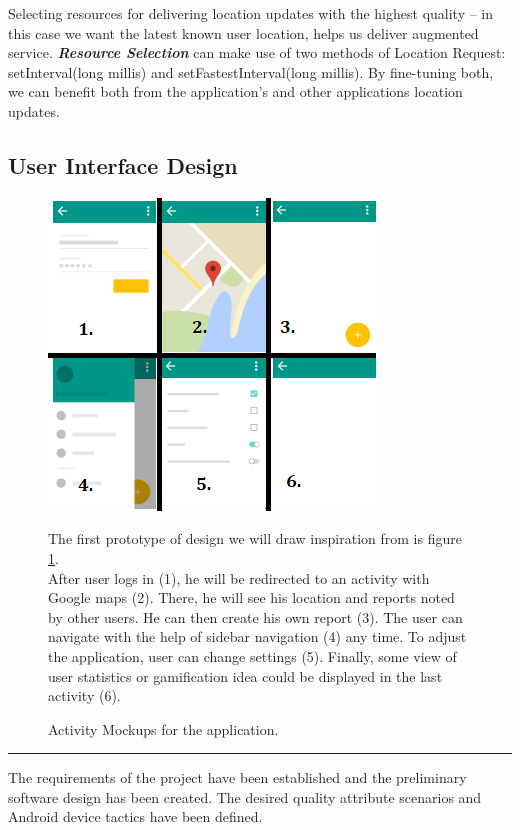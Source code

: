 Selecting resources for delivering location updates with the highest quality – in this case we want the latest known user location, helps us deliver augmented service. \textbf{\textit{Resource Selection}} can make use of two methods of Location Request: setInterval(long millis) and setFastestInterval(long millis). By fine-tuning both, we can benefit both from the application's and other applications location updates.


\subsection{User Interface Design} \label{sec:uidesign}
\begin{figure}[H]
\begin{minipage}{.55\textwidth}
\includegraphics[width=\textwidth]{images/activityDesign}
\caption{Activity Mockups for the application.} \label{fig:activity_design}
\end{minipage}
\hfill
\begin{minipage}{.4\textwidth}
The first prototype of design we will draw inspiration from is figure \ref{fig:activity_design}.
~\\

After user logs in (1), he will be redirected to an activity with Google maps (2). There, he will see his location and reports noted by other users. He can then create his own report (3). The user can navigate with the help of sidebar navigation (4) any time. To adjust the application, user can change settings (5). Finally, some view of user statistics or gamification idea could be displayed in the last activity (6).
\end{minipage}
\end{figure}



\vspace{3em}
\hrule
The requirements of the project have been established and the preliminary software design has been created. The desired quality attribute scenarios and Android device tactics have been defined.